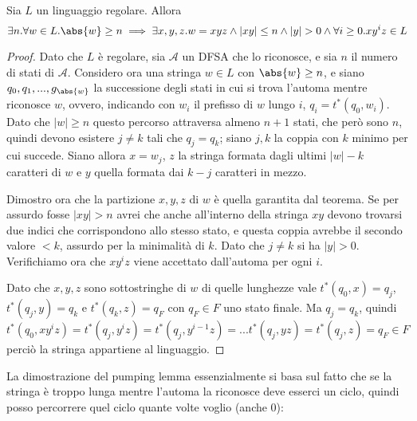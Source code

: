 \documentclass[12pt]{article}
\numberwithin{theorem}{subsection}
\begin{document}
\begin{lemma}
	Sia $L$ un linguaggio regolare. Allora
	\[
	\exists n . \forall w \in L . \abs{w} \ge n \implies \exists x, y, z . w = xyz \land \vert xy \vert \le n \land \vert y \vert > 0 \land \forall i \ge 0 . xy^iz \in L
	\]
\end{lemma}
\begin{proof}	
	Dato che $L$ è regolare, sia $\mathcal{A}$ un DFSA che lo riconosce, e sia $n$ il numero di stati di $\mathcal{A}$. Considero ora una stringa $w \in L$ con $\abs{w} \ge n$, e siano $q_0, q_1, ..., g_{\abs{w}}$ la successione degli stati in cui si trova l'automa mentre riconosce $w$, ovvero, indicando con $w_i$ il prefisso di $w$ lungo $i$, $q_i = t^*(q_0, w_i)$. Dato che $\vert w \vert \ge n$ questo percorso attraversa almeno $n + 1$ stati, che però sono $n$, quindi devono esistere $j \neq k$ tali che $q_j = q_k$; siano $j, k$ la coppia con $k$ minimo per cui succede. Siano allora $x = w_j$, $z$ la stringa formata dagli ultimi $\vert w \vert - k$ caratteri di $w$ e $y$ quella formata dai $k - j$ caratteri in mezzo.
	
	Dimostro ora che la partizione $x, y, z$ di $w$ è quella garantita dal teorema. Se per assurdo fosse $\vert xy \vert > n$ avrei che anche all'interno della stringa $xy$ devono trovarsi due indici che corrispondono allo stesso stato, e questa coppia avrebbe il secondo valore $ < k$, assurdo per la minimalità di $k$. Dato che $j \neq k$ si ha $\vert y \vert > 0$. Verifichiamo ora che $xy^iz$ viene accettato dall'automa per ogni $i$.
	
	Dato che $x, y, z$ sono sottostringhe di $w$ di quelle lunghezze vale $t^*(q_0, x) = q_j$, $t^*(q_j, y) = q_k$ e $t^*(q_k, z) = q_F$ con $q_F \in F$ uno stato finale. Ma $q_j = q_k$, quindi
	\[
	t^*(q_0, xy^iz) = t^*(q_j, y^iz) = t^*(q_j, y^{i-1}z) = ... t^*(q_j, yz) = t^*(q_j, z) = q_F \in F
	\]
	perciò la stringa appartiene al linguaggio.
\end{proof}
La dimostrazione del pumping lemma essenzialmente si basa sul fatto che se la stringa è troppo lunga mentre l'automa la riconosce deve esserci un ciclo, quindi posso percorrere quel ciclo quante volte voglio (anche 0):

\end{document}
